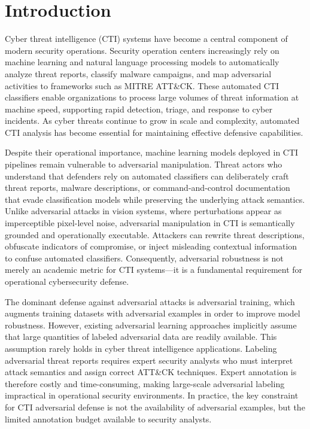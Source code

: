 \documentclass[review,1p,times,number]{elsarticle}
\begin{document}
\clearpage

\section{Introduction}
\label{sec:introduction}

Cyber threat intelligence (CTI) systems have become a central component of
modern security operations. Security operation centers increasingly rely on
machine learning and natural language processing models to automatically
analyze threat reports, classify malware campaigns, and map adversarial
activities to frameworks such as MITRE ATT\&CK. These automated CTI
classifiers enable organizations to process large volumes of threat
information at machine speed, supporting rapid detection, triage, and
response to cyber incidents. As cyber threats continue to grow in scale
and complexity, automated CTI analysis has become essential for maintaining
effective defensive capabilities.

Despite their operational importance, machine learning models deployed in
CTI pipelines remain vulnerable to adversarial manipulation. Threat actors
who understand that defenders rely on automated classifiers can deliberately
craft threat reports, malware descriptions, or command-and-control
documentation that evade classification models while preserving the
underlying attack semantics. Unlike adversarial attacks in vision systems,
where perturbations appear as imperceptible pixel-level noise, adversarial
manipulation in CTI is semantically grounded and operationally executable.
Attackers can rewrite threat descriptions, obfuscate indicators of
compromise, or inject misleading contextual information to confuse automated
classifiers. Consequently, adversarial robustness is not merely an academic
metric for CTI systems—it is a fundamental requirement for operational
cybersecurity defense.

The dominant defense against adversarial attacks is adversarial training,
which augments training datasets with adversarial examples in order to
improve model robustness. However, existing adversarial learning approaches
implicitly assume that large quantities of labeled adversarial data are
readily available. This assumption rarely holds in cyber threat intelligence
applications. Labeling adversarial threat reports requires expert security
analysts who must interpret attack semantics and assign correct ATT\&CK
techniques. Expert annotation is therefore costly and time-consuming,
making large-scale adversarial labeling impractical in operational security
environments. In practice, the key constraint for CTI adversarial defense
is not the availability of adversarial examples, but the limited annotation
budget available to security analysts.
\end{document}

